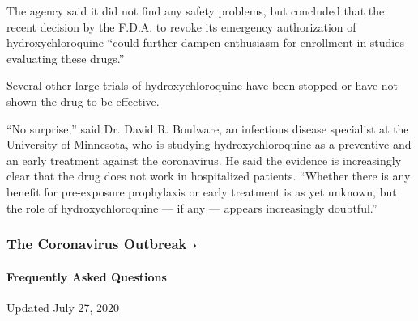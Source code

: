 The agency said it did not find any safety problems, but concluded that
the recent decision by the F.D.A. to revoke its emergency authorization
of hydroxychloroquine ``could further dampen enthusiasm for enrollment
in studies evaluating these drugs.''

Several other large trials of hydroxychloroquine have been stopped or
have not shown the drug to be effective.

``No surprise,'' said Dr. David R. Boulware, an infectious disease
specialist at the University of Minnesota, who is studying
hydroxychloroquine as a preventive and an early treatment against the
coronavirus. He said the evidence is increasingly clear that the drug
does not work in hospitalized patients. ``Whether there is any benefit
for pre-exposure prophylaxis or early treatment is as yet unknown, but
the role of hydroxychloroquine --- if any --- appears increasingly
doubtful.''

\href{https://www.nytimes.com/news-event/coronavirus?action=click\&pgtype=Article\&state=default\&region=MAIN_CONTENT_3\&context=storylines_faq}{}

\hypertarget{the-coronavirus-outbreak-}{%
\subsubsection{The Coronavirus Outbreak
›}\label{the-coronavirus-outbreak-}}

\hypertarget{frequently-asked-questions}{%
\paragraph{Frequently Asked
Questions}\label{frequently-asked-questions}}

Updated July 27, 2020

